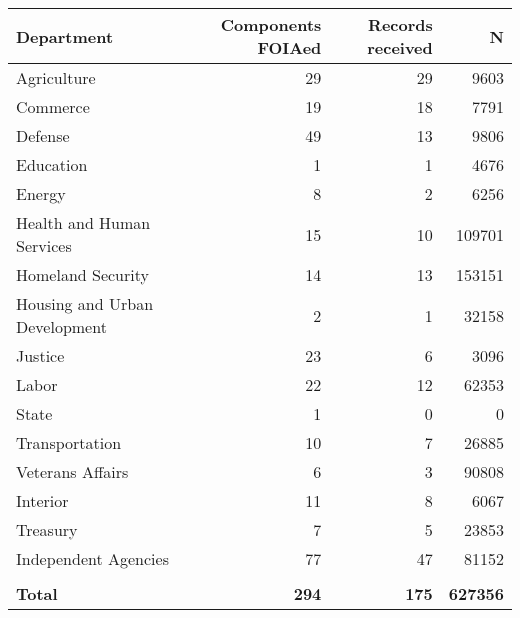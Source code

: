 
\begin{tabular}{lrrr}
\toprule
Department & Components FOIAed & Records received & N\\
\midrule
Agriculture & 29 & 29 & 9603\\
Commerce & 19 & 18 & 7791\\
Defense & 49 & 13 & 9806\\
Education & 1 & 1 & 4676\\
Energy & 8 & 2 & 6256\\
\addlinespace
Health and Human Services & 15 & 10 & 109701\\
Homeland Security & 14 & 13 & 153151\\
Housing and Urban Development & 2 & 1 & 32158\\
Justice & 23 & 6 & 3096\\
Labor & 22 & 12 & 62353\\
\addlinespace
State & 1 & 0 & 0\\
Transportation & 10 & 7 & 26885\\
Veterans Affairs & 6 & 3 & 90808\\
Interior & 11 & 8 & 6067\\
Treasury & 7 & 5 & 23853\\
\addlinespace
Independent Agencies & 77 & 47 & 81152\\
\midrule\\
\textbf{Total} & \textbf{294} & \textbf{175} & \textbf{627356}\\
\bottomrule
\end{tabular}